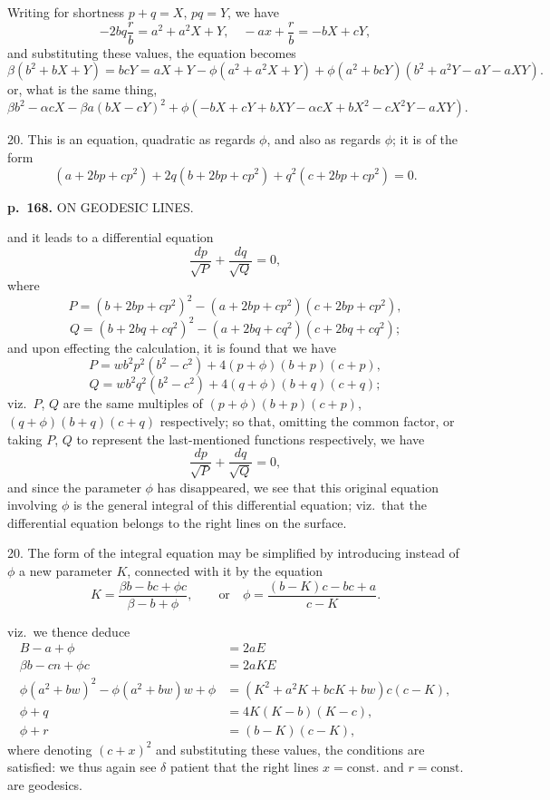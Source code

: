 \documentclass[11pt,a4paper]{article}
\begin{document}
Writing for shortness $p + q = X$, $pq = Y$, we have
\[
- 2bq\frac{r}{b} = a^2 + a^2 X + Y, \quad -ax + \frac{r}{b} = -bX + cY,
\]
and substituting these values, the equation becomes
\[
\beta (b^2 + bX + Y) = bcY = aX + Y - \phi (a^2 + a^2 X + Y) + \phi (a^2 + bcY)(b^2 + a^2 Y - aY - aXY).
\]
or, what is the same thing,
\[
\beta b^2 - \alpha c X - \beta a (b X - cY)^2 + \phi (-b X + cY + b X Y - \alpha c X + bX^2 - c X^2 Y - aXY).
\]

20. This is an equation, quadratic as regards $\phi$, and also as regards $\phi$; it is of the form
\[
(a + 2bp + cp^2)
+ 2q (b + 2bp + cp^2)
+ q^2 (c + 2bp + cp^2) = 0.
\]

\clearpage

\noindent
\textbf{p.~168.}  ON GEODESIC LINES.

and it leads to a differential equation
\[
\frac{dp}{\sqrt{P}} + \frac{dq}{\sqrt{Q}} = 0,
\]
where
\[
P = (b + 2bp + cp^2)^2 - (a + 2bp + cp^2)(c + 2bp + cp^2),
\]
\[
Q = (b + 2bq + cq^2)^2 - (a + 2bq + cq^2)(c + 2bq + cq^2);
\]
and upon effecting the calculation, it is found that we have
\[
P = w b^2 p^2 (b^2 - c^2) + 4(p + \phi)(b + p)(c + p),
\]
\[
Q = w b^2 q^2 (b^2 - c^2) + 4(q + \phi)(b + q)(c + q);
\]
viz.\ $P$, $Q$ are the same multiples of $(p+\phi)(b+p)(c+p)$, $(q+\phi)(b+q)(c+q)$ respectively; so that, omitting the common factor, or taking $P$, $Q$ to represent the last-mentioned functions respectively, we have
\[
\frac{dp}{\sqrt{P}} + \frac{dq}{\sqrt{Q}} = 0,
\]
and since the parameter $\phi$ has disappeared, we see that this original equation involving $\phi$ is the general integral of this differential equation; viz.\ that the differential equation belongs to the right lines on the surface.

20. The form of the integral equation may be simplified by introducing instead of $\phi$ a new parameter $K$, connected with it by the equation
\[
K = \frac{\beta b - bc + \phi c}{\beta - b + \phi}, \qquad \text{or} \quad \phi = \frac{(b - K)c - bc + a}{c - K}.
\]

viz.\ we thence deduce
\begin{align*}
B - a + \phi &= 2aE \\
\beta b - cn + \phi c &= 2aKE \\
\phi (a^2 + bw)^2 - \phi (a^2 + bw)w + \phi &= (K^2 + a^2 K + bcK + bw)c (c - K), \\
\phi + q &= 4K(K - b)(K - c), \\
\phi + r &= (b - K)(c - K),
\end{align*}
where denoting $(c+x)^2$ and substituting these values, the conditions are satisfied: we thus again see $\delta$ patient that the right lines $x = \text{const.}$ and $r = \text{const.}$ are geodesics.
\end{document}
